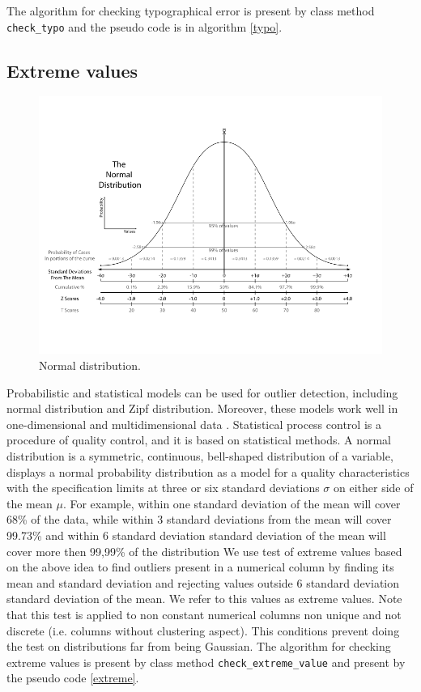\documentclass{article}
\begin{document}
The algorithm for checking typographical error is present by class method \texttt{check\_typo} and the pseudo code is in algorithm \ref{typo}.

\subsection{Extreme values} %
\label{sub:Extreme values}
\begin{figure}[H]
    \centering
    \includegraphics[width=0.8\linewidth]{picture/normal.png}
    \caption{Normal distribution.}
    \label{fig:normal}
\end{figure}
Probabilistic and statistical models can be used for outlier detection, including normal distribution and Zipf distribution. Moreover, these models work well in one-dimensional and
multidimensional data \cite{dai_yosh_pars}.
Statistical process control is a procedure of quality control, and it is based on statistical methods.
A normal distribution is a symmetric, continuous, bell-shaped distribution of a variable, displays a normal probability distribution as a model for a quality characteristics with the specification limits at three or six standard deviations $\sigma$ on either side of the mean $\mu$.
For example, within one standard deviation of the mean will cover 68\% of the data, while within 3 standard deviations from the mean will cover 99.73\% and within 6 standard deviation standard deviation of the mean will cover more then 99,99\% of the distribution
We use test of extreme values based on the above idea to find outliers present in a numerical column by finding its mean and standard deviation and rejecting values outside 6 standard deviation standard deviation of the mean.
We refer to this values as extreme values. Note that this test is applied to non constant numerical columns non unique and not discrete (i.e. columns without clustering aspect). This conditions prevent doing the test on distributions far from being Gaussian.
The algorithm for checking extreme values is present by class method \texttt{check\_extreme\_value}  and present by the pseudo code \ref{extreme}.
\end{document}
